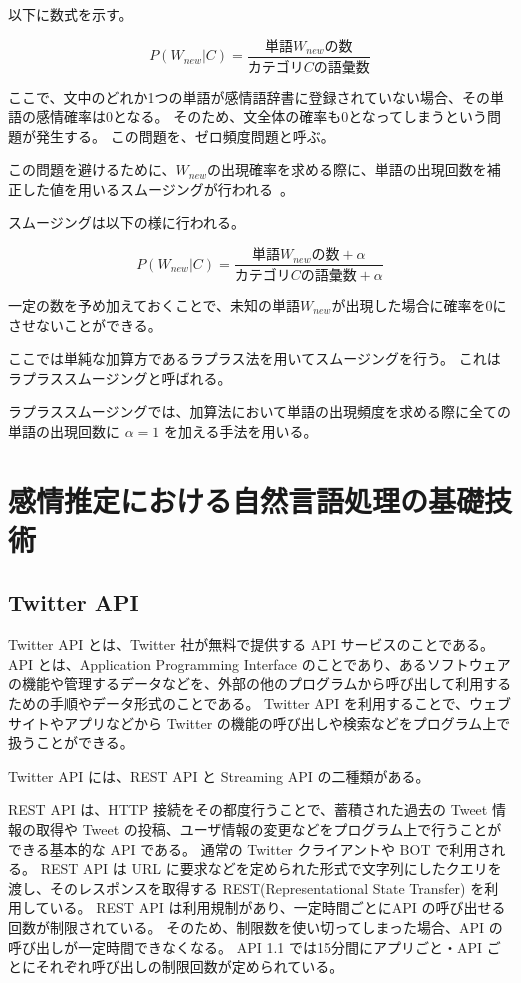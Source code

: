 \documentclass[11pt,a4j]{jsarticle}
\begin{document}
以下に数式を示す。

\[
P(W_\mathit{new}|C)=\frac{単語 W_\mathit{new} の数}{カテゴリC の語彙数}
\]

ここで、文中のどれか1つの単語が感情語辞書に登録されていない場合、その単語の感情確率は0となる。
そのため、文全体の確率も0となってしまうという問題が発生する。
この問題を、ゼロ頻度問題と呼ぶ。


この問題を避けるために、$W_\mathit{new}$の出現確率を求める際に、単語の出現回数を補正した値を用いるスムージングが行われる~。

スムージングは以下の様に行われる。

\[
P(W_\mathit{new}|C)=\frac{単語 W_\mathit{new} の数 + \alpha }{カテゴリC の語彙数 + \alpha }
\]

一定の数を予め加えておくことで、未知の単語$W_\mathit{new}$が出現した場合に確率を0にさせないことができる。

ここでは単純な加算方であるラプラス法を用いてスムージングを行う。
これはラプラススムージングと呼ばれる。

ラプラススムージングでは、加算法において単語の出現頻度を求める際に全ての単語の出現回数に $\alpha=1$ を加える手法を用いる。
 
\section{感情推定における自然言語処理の基礎技術}
\subsection{Twitter API}
 Twitter API とは、Twitter 社が無料で提供する API サービスのことである。
API とは、Application Programming Interface のことであり、あるソフトウェアの機能や管理するデータなどを、外部の他のプログラムから呼び出して利用するための手順やデータ形式のことである。
Twitter API を利用することで、ウェブサイトやアプリなどから Twitter の機能の呼び出しや検索などをプログラム上で扱うことができる。

Twitter API には、REST API と Streaming API の二種類がある。

REST API は、HTTP 接続をその都度行うことで、蓄積された過去の Tweet 情報の取得や Tweet の投稿、ユーザ情報の変更などをプログラム上で行うことができる基本的な API である。
通常の Twitter クライアントや BOT で利用される。
REST API は URL に要求などを定められた形式で文字列にしたクエリを渡し、そのレスポンスを取得する REST(Representational State Transfer) を利用している。
REST API は利用規制があり、一定時間ごとにAPI の呼び出せる回数が制限されている。
そのため、制限数を使い切ってしまった場合、API の呼び出しが一定時間できなくなる。
API 1.1 では15分間にアプリごと・API ごとにそれぞれ呼び出しの制限回数が定められている。
\end{document}
